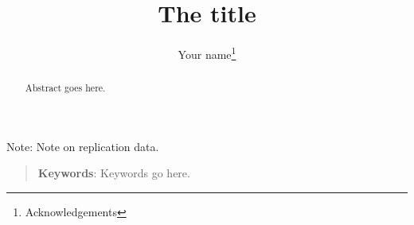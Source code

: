 \documentclass[12pt, letterpaper]{article}
\title{The title}
\author{Your name\thanks{Acknowledgements}}
\begin{document}
 
\maketitle
\doublespacing
\vspace{5.5in}
\noindent Note: Note on replication data.
\thispagestyle{empty}
\newpage
\thispagestyle{empty}
\begin{abstract}
\begin{normalsize}
\noindent Abstract goes here.

\end{normalsize}
\end{abstract}

\begin{quote}
\textbf{Keywords}: Keywords go here.
\end{quote}
\newpage

\newpage



\end{document}
